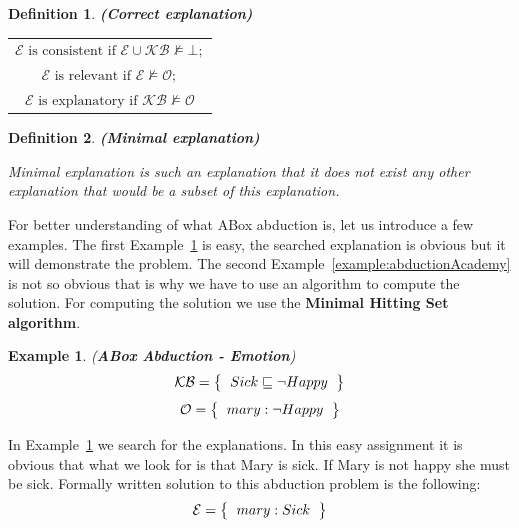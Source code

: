 \documentclass[12pt,a4paper]{article}
\newtheorem{definition}{Definition}[subsection]
\newtheorem{example}{Example}[subsection]
\begin{document}
\newpage
\begin{definition}{\textbf{(Correct explanation)}}
	\begin{table}[H]
		\centering
		\begin{tabular}{c}
			$\mathcal{E} \text{ is consistent if } \mathcal{E} \cup \mathcal{KB} \not \models \mathcal{\bot};$ \\
			\addlinespace[0.4cm]
			$\mathcal{E} \text{ is relevant if } \mathcal{E} \not \models \mathcal{O};$ \\
			\addlinespace[0.4cm]
			$\mathcal{E} \text{ is explanatory if } \mathcal{KB} \not \models \mathcal{O}$ \\
		\end{tabular}
	\end{table}
\end{definition}

\begin{definition}{\textbf{(Minimal explanation)}}
	
	Minimal explanation is such an explanation that it does not exist any other explanation that would be a subset of this explanation.
\end{definition}

For better understanding of what ABox abduction is, let us introduce a few examples. The first Example~\ref{example:abductionEmotion} is easy, the searched explanation is obvious but it will demonstrate the problem. The second Example~\ref{example:abductionAcademy} is not so obvious that is why we have to use an algorithm to compute the solution. For computing the solution we use the \textbf{Minimal Hitting Set algorithm}.

\begin{example}{(\textbf{ABox Abduction - Emotion})}
	\label{example:abductionEmotion}
	\[ 
	\mathcal{KB} = \left\{
	\begin{tabular}{c c}
	$Sick \sqsubseteq \neg Happy$
	\end{tabular}
	\right \}
	\]
	\[ 
	\mathcal{O} = \left\{
	\begin{tabular}{c c}
	$mary : \neg Happy$
	\end{tabular}
	\right \}
	\]								
\end{example}

In Example~\ref{example:abductionEmotion} we search for the explanations. In this easy assignment it is obvious that what we look for is that Mary is sick. If Mary is not happy she must be sick. Formally written solution to this abduction problem is the following:
\[ 
\mathcal{E} = \left\{
\begin{tabular}{c c}
$mary : Sick$
\end{tabular}
\right \}
\]
\end{document}
